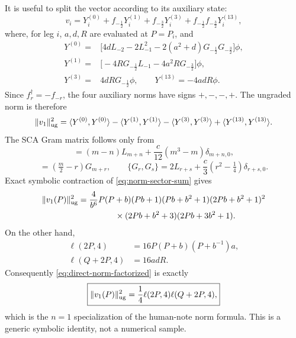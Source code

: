 \documentclass[11pt]{article}
\newcommand{\half}{\tfrac12}
\begin{document}
It is useful to split the vector according to its auxiliary state:
\begin{equation}
 v_i=Y_i^{(0)}+f_{-\half}Y_i^{(1)}
       +f_{-\frac32}Y_i^{(3)}
       +f_{-\half}f_{-\frac32}Y_i^{(13)},
 \label{eq:block-split}
\end{equation}
where, for leg \(i\), \(a,d,R\) are evaluated at \(P=P_i\), and
\begin{align}
Y^{(0)}={}&
 \big[4dL_{-2}-2L_{-1}^2
 -2(a^2+d)G_{-\half}G_{-\frac32}\big]\phi,
 \label{eq:Y0}\\
Y^{(1)}={}&
 \big[-4R G_{-\half}L_{-1}-4a^2R G_{-\frac32}\big]\phi,
 \label{eq:Y1}\\
Y^{(3)}={}&4dR G_{-\half}\phi,
\qquad
Y^{(13)}=-4adR\phi.
 \label{eq:Y313}
\end{align}
Since \(f_r^\dagger=-f_{-r}\), the four auxiliary norms have signs
\(+,-,-,+\).  The ungraded norm is therefore
\begin{equation}
 \lVert v_1\rVert_{\rm ug}^2
 =\langle Y^{(0)},Y^{(0)}\rangle
 -\langle Y^{(1)},Y^{(1)}\rangle
 -\langle Y^{(3)},Y^{(3)}\rangle
 +\langle Y^{(13)},Y^{(13)}\rangle.
 \label{eq:norm-sector-sum}
\end{equation}
The SCA Gram matrix follows only from
\begin{equation}
 [L_m,L_n]=(m-n)L_{m+n}+\frac{c}{12}(m^3-m)\delta_{m+n,0},
\end{equation}
\begin{equation}
 [L_m,G_r]=(\tfrac m2-r)G_{m+r},\qquad
 \{G_r,G_s\}=2L_{r+s}+\frac c3(r^2-\tfrac14)\delta_{r+s,0}.
\end{equation}
Exact symbolic contraction of \eqref{eq:norm-sector-sum} gives
\begin{align}
\lVert v_1(P)\rVert_{\rm ug}^2
={}&\frac{4}{b^6}P(P+b)(Pb+1)(Pb+b^2+1)
 (2Pb+b^2+1)^2\notag\\
&\hspace{1.1cm}\times
 (2Pb+b^2+3)(2Pb+3b^2+1).
 \label{eq:direct-norm-factorized}
\end{align}
On the other hand,
\begin{align}
 \ell(2P,4)&=16P(P+b)(P+b^{-1})a,\\
 \ell(Q+2P,4)&=16adR.
\end{align}
Consequently \eqref{eq:direct-norm-factorized} is exactly
\begin{equation}
 \boxed{
 \lVert v_1(P)\rVert_{\rm ug}^2
 =\frac14\ell(2P,4)\ell(Q+2P,4),}
 \label{eq:norm-agreement}
\end{equation}
which is the \(n=1\) specialization of the human-note norm formula.  This is
a generic symbolic identity, not a numerical sample.
\end{document}
